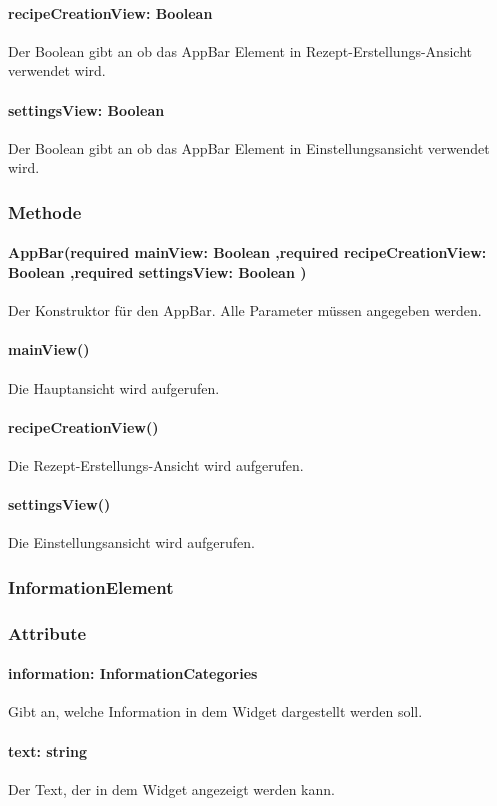 \documentclass[parskip=full]{scrartcl}
\begin{document}
\paragraph*{recipeCreationView: Boolean} Der Boolean gibt an ob das AppBar Element in Rezept-Erstellungs-Ansicht verwendet wird.
\paragraph*{settingsView: Boolean} Der Boolean gibt an ob das AppBar Element in Einstellungsansicht verwendet wird.

\subsubsection*{Methode}
\paragraph*{AppBar(required mainView: Boolean ,required recipeCreationView: Boolean ,required settingsView: Boolean )} Der Konstruktor für den AppBar. Alle Parameter müssen angegeben werden.
\paragraph*{mainView()} Die Hauptansicht wird aufgerufen.
\paragraph*{recipeCreationView()} Die Rezept-Erstellungs-Ansicht wird aufgerufen.
\paragraph*{settingsView()} Die Einstellungsansicht wird aufgerufen.


\subsubsection{InformationElement} \label{sec:InformationElement}
\subsubsection*{Attribute}
\paragraph*{information: InformationCategories} Gibt an, welche Information in dem Widget dargestellt werden soll.
\paragraph*{text: string} Der Text, der in dem Widget angezeigt werden kann.
\end{document}
